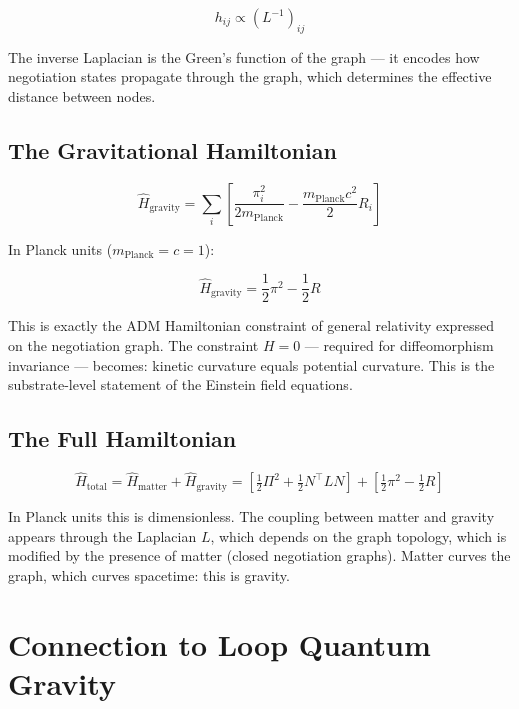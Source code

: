 \documentclass[11pt,letterpaper]{article}
\begin{document}
\begin{equation}
h_{ij} \propto (L^{-1})_{ij}
\end{equation}

The inverse Laplacian is the Green's function of the graph --- it encodes how negotiation states propagate through the graph, which determines the effective distance between nodes.

\subsection{The Gravitational Hamiltonian}
\label{sec:org0c1863c}

\begin{equation}
\hat{H}_\text{gravity} = \sum_i \left[\frac{\pi_i^2}{2m_\text{Planck}} - \frac{m_\text{Planck} c^2}{2} R_i\right]
\end{equation}

In Planck units (\(m_\text{Planck} = c = 1\)):

\begin{equation}
\hat{H}_\text{gravity} = \frac{1}{2}\pi^2 - \frac{1}{2}R
\end{equation}

This is exactly the ADM Hamiltonian constraint of general relativity expressed on the negotiation graph. The constraint \(H = 0\) --- required for diffeomorphism invariance --- becomes: kinetic curvature equals potential curvature. This is the substrate-level statement of the Einstein field equations.

\subsection{The Full Hamiltonian}
\label{sec:orgc58c6f1}

\begin{equation}
\hat{H}_\text{total} = \hat{H}_\text{matter} + \hat{H}_\text{gravity} = \left[\tfrac{1}{2}\Pi^2 + \tfrac{1}{2}N^\top L N\right] + \left[\tfrac{1}{2}\pi^2 - \tfrac{1}{2}R\right]
\end{equation}

In Planck units this is dimensionless. The coupling between matter and gravity appears through the Laplacian \(L\), which depends on the graph topology, which is modified by the presence of matter (closed negotiation graphs). Matter curves the graph, which curves spacetime: this is gravity.

\section{Connection to Loop Quantum Gravity}
\label{sec:org418d823}
\end{document}
